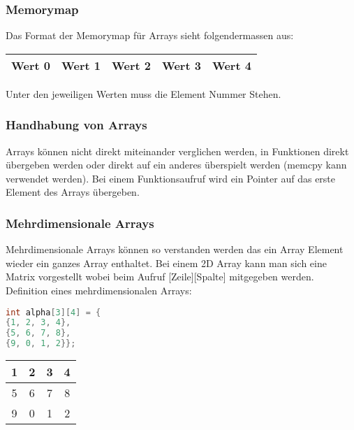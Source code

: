 \subsubsection{Memorymap}

Das Format der Memorymap für Arrays sieht folgendermassen aus:\newline

\begin{tabular}{|c|c|c|c|c|}
\hline
Wert 0&Wert 1& Wert 2& Wert 3&Wert 4\\ \hline
\end{tabular}

Unter den jeweiligen Werten muss die Element Nummer Stehen.

\subsubsection{Handhabung von Arrays}

Arrays können nicht direkt miteinander verglichen werden, in Funktionen direkt übergeben werden oder direkt auf ein anderes überspielt werden (memcpy kann verwendet werden).\newline
Bei einem Funktionsaufruf wird ein Pointer auf das erste Element des Arrays übergeben.

\subsubsection{Mehrdimensionale Arrays}

Mehrdimensionale Arrays können so verstanden werden das ein Array Element wieder ein ganzes Array enthaltet.\newline
Bei einem 2D Array kann man sich eine Matrix vorgestellt wobei beim Aufruf [Zeile][Spalte] mitgegeben werden.\newline
Definition eines mehrdimensionalen Arrays:\newline
\noindent
\begin{minipage}{0.5\columnwidth}
\begin{lstlisting}[language = c]
int alpha[3][4] = {
{1, 2, 3, 4},
{5, 6, 7, 8},
{9, 0, 1, 2}};
\end{lstlisting}
\end{minipage}
\begin{minipage}{0.5\columnwidth}
\begin{tabular}{|c|c|c|c|}
\hline
1 & 2 & 3 & 4 \\ \hline
5 & 6 & 7 & 8 \\ \hline
9 & 0 & 1 & 2 \\ \hline
\end{tabular}
\end{minipage}

